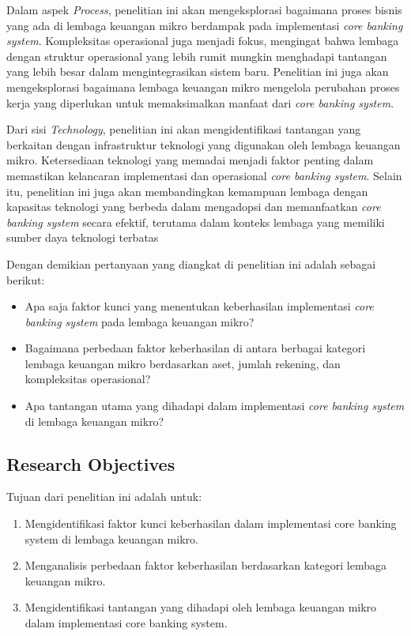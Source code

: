 \documentclass[journal,article,submit,pdftex,moreauthors]{Definitions/mdpi}
\begin{document}
Dalam aspek \textit{Process}, penelitian ini akan mengeksplorasi bagaimana proses bisnis yang ada di lembaga keuangan mikro berdampak pada implementasi \textit{core banking system}. Kompleksitas operasional juga menjadi fokus, mengingat bahwa lembaga dengan struktur operasional yang lebih rumit mungkin menghadapi tantangan yang lebih besar dalam mengintegrasikan sistem baru. Penelitian ini juga akan mengeksplorasi bagaimana lembaga keuangan mikro mengelola perubahan proses kerja yang diperlukan untuk memaksimalkan manfaat dari \textit{core banking system}.

Dari sisi \textit{Technology}, penelitian ini akan mengidentifikasi tantangan yang berkaitan dengan infrastruktur teknologi yang digunakan oleh lembaga keuangan mikro. Ketersediaan teknologi yang memadai menjadi faktor penting dalam memastikan kelancaran implementasi dan operasional \textit{core banking system}. Selain itu, penelitian ini juga akan membandingkan kemampuan lembaga dengan kapasitas teknologi yang berbeda dalam mengadopsi dan memanfaatkan \textit{core banking system} secara efektif, terutama dalam konteks lembaga yang memiliki sumber daya teknologi terbatas

Dengan demikian pertanyaan yang diangkat di penelitian ini adalah sebagai berikut:
\begin{itemize}
    \item Apa saja faktor kunci yang menentukan keberhasilan implementasi \textit{core banking system} pada lembaga keuangan mikro?
    \item Bagaimana perbedaan faktor keberhasilan di antara berbagai kategori lembaga keuangan mikro berdasarkan aset, jumlah rekening, dan kompleksitas operasional?
    \item Apa tantangan utama yang dihadapi dalam implementasi \textit{core banking system} di lembaga keuangan mikro?
\end{itemize}

\subsection{Research Objectives}
Tujuan dari penelitian ini adalah untuk:
\begin{enumerate}
    \item Mengidentifikasi faktor kunci keberhasilan dalam implementasi core banking system di lembaga keuangan mikro.
    \item Menganalisis perbedaan faktor keberhasilan berdasarkan kategori lembaga keuangan mikro.
    \item Mengidentifikasi tantangan yang dihadapi oleh lembaga keuangan mikro dalam implementasi core banking system.
\end{enumerate}
\end{document}
